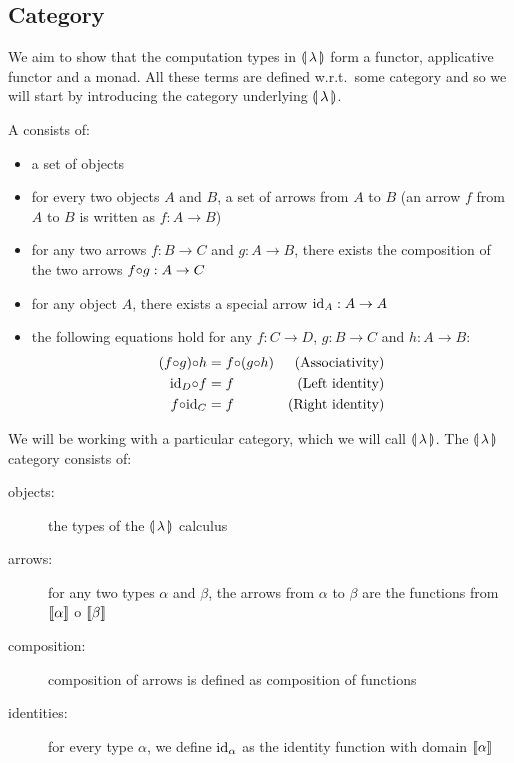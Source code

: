 \subsection{Category}
\label{ssec:category}

We aim to show that the computation types in $\llparenthesis \, \lambda \, \rrparenthesis$ form a
functor, applicative functor and a monad. All these terms are defined
w.r.t.\ some category and so we will start by introducing the category
underlying $\llparenthesis \, \lambda \, \rrparenthesis$.

\begin{definition}
 A  consists of:
\begin{itemize}
\item a set of objects
\item for every two objects $A$ and $B$, a set of arrows from $A$ to $B$
  (an arrow $f$ from $A$ to $B$ is written as $f : A \to B$)
\item for any two arrows $f : B \to C$ and $g : A \to B$, there exists the
  composition of the two arrows $f {\mathbin{\circ}} g : A \to C$
\item for any object $A$, there exists a special arrow $\mathrm{id}_A : A \to A$
\item the following equations hold for any $f : C \to D$, $g : B \to C$ and
  $h : A \to B$:
  \begin{align}
    \label{law:cat-associativity}(f {\mathbin{\circ}} g) {\mathbin{\circ}} h &= f {\mathbin{\circ}} (g {\mathbin{\circ}} h) & \text{(Associativity)} \\
    \label{law:cat-left-identity}\mathrm{id}_D {\mathbin{\circ}} f &= f & \text{(Left identity)} \\
    \label{law:cat-right-identity}f {\mathbin{\circ}} \mathrm{id}_C &= f & \text{(Right identity)}
  \end{align}
\end{itemize}
\end{definition}

We will be working with a particular category, which we will call
$\llparenthesis \, \lambda \, \rrparenthesis$. The $\llparenthesis \, \lambda \, \rrparenthesis$ category consists of:
\begin{description}
\item[objects:] the types of the $\llparenthesis \, \lambda \, \rrparenthesis$ calculus
\item[arrows:] for any two types $\alpha$ and $\beta$, the arrows from
  $\alpha$ to $\beta$ are the functions from $\llbracket \alpha \rrbracket$ o
  $\llbracket \beta \rrbracket$
\item[composition:] composition of arrows is defined as composition of functions
\item[identities:] for every type $\alpha$, we define $\mathrm{id}_\alpha$ as the
  identity function with domain $\llbracket \alpha \rrbracket$
\end{description}

